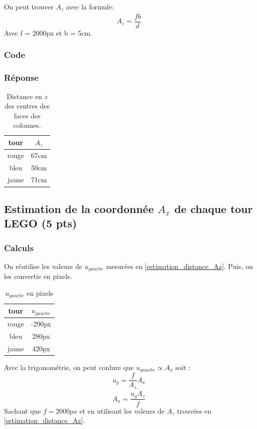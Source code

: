 \documentclass[12pt]{article}
\begin{document}
On peut trouver $A_z$ avec la formule:
\[ A_z = \frac{f \dot b}{d}\]
Avec f = 2000px et b = 5cm.

\subsubsection{Code}
\subsubsection{Réponse}

\begin{table}[h]
\caption{Distance en $z$ des centres des faces des colonnes.}
\label{TableCoord}
\begin{center}
\begin{tabular}{|c|c|}
\hline
 tour   & $A_z$ \\
\hline
 rouge  & 67cm \\
 bleu   & 50cm \\
jaune   & 71cm \\
\hline
\end{tabular}
\end{center}
\end{table}


\subsection{Estimation de la coordonnée $A_x$ de chaque tour LEGO (5 pts)}
\subsubsection{Calculs}
On r\'eutilise les valeurs de $u_{gauche}$ mesur\'ees en \ref{estimation_distance_Az}.
Puis, on les convertie en pixels.

\begin{table}[h]
    \caption{$u_{gauche}$ en pixels}
\label{TableCoord}
\begin{center}
\begin{tabular}{|c|c|}
\hline
    tour   &  $u_{gauche}$\\
\hline
    rouge  & -290px  \\
    bleu   & 280px   \\
    jaune  & 420px   \\
\hline
\end{tabular}
\end{center}
\end{table}

Avec la trigonométrie, on peut conlure que $u_{gauche} \propto A_x$ soit :
\[ u_g = \frac{f}{A_z}A_x\]
\[ A_x = \frac{u_g \dot A_z}{f} \]
Sachant que $f = 2000px$ et en utilisant les valeurs de $A_z$ trouvées en \ref{estimation_distance_Az}.
\end{document}
